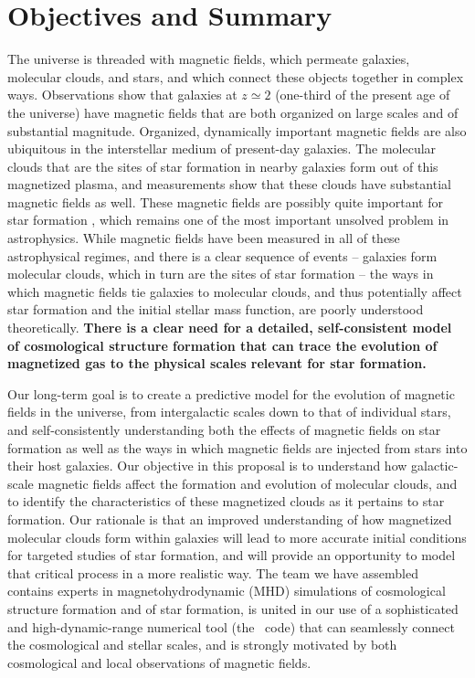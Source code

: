 \section{Objectives and Summary}


The universe is threaded with magnetic fields, which permeate
galaxies, molecular clouds, and stars, and which connect these objects
together in complex ways.  Observations show that galaxies at $z
\simeq 2$ (one-third of the present age of the universe) have magnetic
fields that are both organized on large scales and of substantial
magnitude.  Organized, dynamically important magnetic fields are also
ubiquitous in the interstellar medium of present-day galaxies.  The
molecular clouds that are the sites of star formation in nearby
galaxies form out of this magnetized plasma, and measurements show
that these clouds have substantial magnetic fields as well.  These
magnetic fields are possibly quite important for star formation
, which
remains one of the most important unsolved problem in astrophysics.
While magnetic fields have been measured in all of these astrophysical
regimes, and there is a clear sequence of events -- galaxies form
molecular clouds, which in turn are the sites of star formation -- the
ways in which magnetic fields tie galaxies to molecular clouds, and
thus potentially affect star formation and the initial stellar mass
function, are poorly understood theoretically.  \textbf{There is a
clear need for a detailed, self-consistent model of cosmological
structure formation that can trace the evolution of magnetized gas to
the physical scales relevant for star formation.}

Our long-term goal is to create a predictive model for the evolution
of magnetic fields in the universe, from intergalactic scales down to
that of individual stars, and self-consistently understanding both the
effects of magnetic fields on star formation as well as the ways in
which magnetic fields are injected from stars into their host
galaxies.  Our objective in this proposal is to understand how
galactic-scale magnetic fields affect the formation and evolution of
molecular clouds, and to identify the characteristics of these
magnetized clouds as it pertains to star formation.  Our rationale is
that an improved understanding of how magnetized molecular clouds form
within galaxies will lead to more accurate initial conditions for
targeted studies of star formation, and will provide an opportunity to
model that critical process in a more realistic way.  The team we have
assembled contains experts in magnetohydrodynamic (MHD) simulations of
cosmological structure formation and of star formation, is united in
our use of a sophisticated and high-dynamic-range numerical tool (the
\enzo\ code) that can seamlessly connect the cosmological and stellar
scales, and is strongly motivated by both cosmological and local
observations of magnetic fields.

